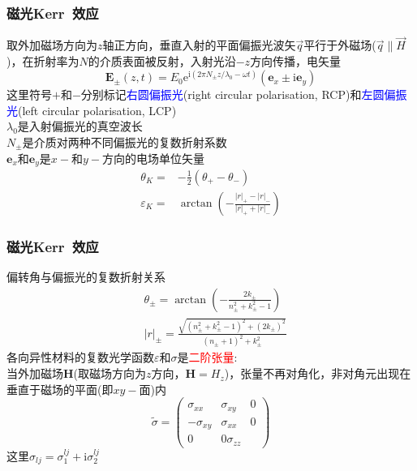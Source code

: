 \documentclass[cjk,slidestop,compress,mathserif,blue]{beamer}
\begin{document}
\frame
{
	\frametitle{磁光\textrm{Kerr~}效应}
	取外加磁场方向为$z$轴正方向，垂直入射的平面偏振光波矢$\vec q$平行于外磁场($\vec q\parallel\vec H$)，在折射率为$N$的介质表面被反射，入射光沿$-z$方向传播，电矢量
	\begin{displaymath}
		\mathbf{E}_{\pm}(z,t)=E_0\mathrm{e}^{\mathrm{i}(2\pi N_{\pm}z/\lambda_0-\omega t)}(\mathbf{e}_x\pm\mathrm{i}\mathbf{e}_y)
	\end{displaymath}
	这里符号$+$和$-$分别标记\textcolor{blue}{右圆偏振光}(\textrm{right circular polarisation, RCP})和\textcolor{blue}{左圆偏振光}(\textrm{left circular polarisation, LCP})\\
	$\lambda_0$是入射偏振光的真空波长\\
	$N_{\pm}$是介质对两种不同偏振光的复数折射系数\\
	$\mathbf{e}_x$和$\mathbf{e}_y$是$x-$和$y-$方向的电场单位矢量
	\begin{displaymath}
		\begin{aligned}
			\theta_K=&-\frac12(\theta_+-\theta_-)\\
			\varepsilon_K=&\arctan\left( -\frac{|r|_+-|r|_-}{|r|_++|r|_-} \right)
		\end{aligned}
	\end{displaymath}
}

\frame
{
	\frametitle{磁光\textrm{Kerr~}效应}
	偏转角与偏振光的复数折射关系
	\begin{displaymath}
		\begin{aligned}
			&\theta_{\pm}=\arctan\left( -\frac{2k_{\pm}}{n_{\pm}^2+k_{\pm}^2-1} \right)\\
			&|r|_{\pm}=\frac{\sqrt{(n_{\pm}^2+k_{\pm}^2-1)^2+(2k_{\pm})^2}}{(n_{\pm}+1)^2+k_{\pm}^2}
		\end{aligned}
	\end{displaymath}
	各向异性材料的复数光学函数$\varepsilon$和$\sigma$是\textcolor{red}{二阶张量}:\\
	当外加磁场$\mathbf{H}$(取磁场方向为$z$方向，$\mathbf{H}=H_z$)，张量不再对角化，非对角元出现在垂直于磁场的平面(即$xy-$面)内
	\begin{displaymath}
		\tilde\sigma=\left(
		\begin{matrix}
			\sigma_{xx} &\sigma_{xy} &0\\
			-\sigma_{xy} &\sigma_{xx} &0\\
			0 &0 \sigma_{zz}
		\end{matrix}\right)
	\end{displaymath}
	这里$\sigma_{lj}=\sigma_1^{lj}+\mathrm{i}\sigma_2^{lj}$
}
\end{document}
